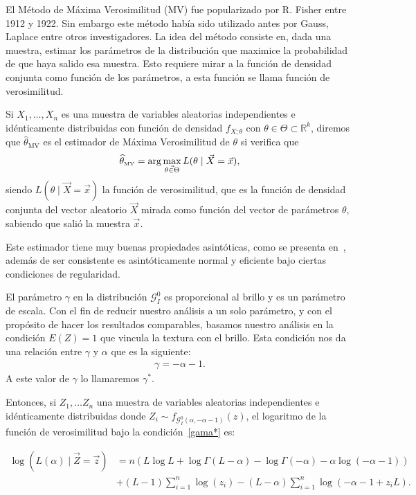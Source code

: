  El Método de Máxima Verosimilitud (MV) fue popularizado por R. Fisher entre 1912 y 1922. Sin embargo este método había sido utilizado antes por Gauss, Laplace entre otros investigadores. La idea del método consiste en, dada una muestra, estimar los parámetros de la distribución que maximice la probabilidad de que haya salido esa muestra. Esto requiere mirar a la función de densidad conjunta como función de los parámetros, a esta función se llama función de verosimilitud.
\begin{definition}
Si $X_1, \ldots, X_n$ es una muestra de variables aleatorias independientes e idénticamente distribuidas con función de densidad $f_{X;\theta}$  con $\theta \in \Theta \subset \mathbb{R}^k$, diremos que $\widehat{\theta}_{\text{MV}}$ es el estimador de Máxima Verosimilitud de $\theta$ si verifica que 
\begin{align}
\widehat{\theta}_{{\text{\tiny{\text{MV}}}}}=\arg\max_{\vec{\theta \in \Theta}} L(\theta \mid \vec{X}=\vec{x}),
\end{align}
siendo $L(\theta \mid \vec{X}=\vec{x})$ la función de verosimilitud, que es la función de densidad conjunta del vector aleatorio $\vec{X}$ mirada como función del vector de parámetros $\theta$, sabiendo que salió la muestra $\vec{x}$.
\end{definition}
Este estimador tiene muy buenas propiedades asintóticas, como se presenta en~\citet{Casela2002}, además de ser consistente es asintóticamente normal y eficiente bajo ciertas condiciones de regularidad.


El parámetro $\gamma$ en la distribución $\mathcal{G}_I^0$  es proporcional al brillo y es un parámetro de escala. Con el fin de reducir nuestro análisis a un solo parámetro, y con el propósito de hacer los resultados comparables, basamos nuestro análisis en la condición $E(Z)=1$ que vincula la textura con el brillo. Esta condición nos da una relación entre $\gamma$ y $\alpha$ que es la siguiente:
\begin{align}
\label{gama*}
\gamma=-\alpha-1. 
\end{align}
A este valor de $\gamma$ lo llamaremos $\gamma^*$.

Entonces, si $Z_1,\ldots Z_n$ una muestra de variables aleatorias independientes e idénticamente distribuidas donde $Z_i \sim f_{\mathcal G_I^0(\alpha,-\alpha-1)}(z)$,  el logaritmo de la función de verosimilitud bajo la condición~\eqref{gama*} es:


\begin{align}
\nonumber \log (L(\alpha) \mid \vec{Z}=\vec{z})&=n(L \log L+\log \Gamma(L-\alpha)-\log \Gamma(-\alpha) -\alpha \log(-\alpha-1))\\
& + (L-1) \sum_{i=1}^n \log(z_i)-(L-\alpha) \sum_{i=1}^n\log(-\alpha-1+z_i L).
\end{align}



